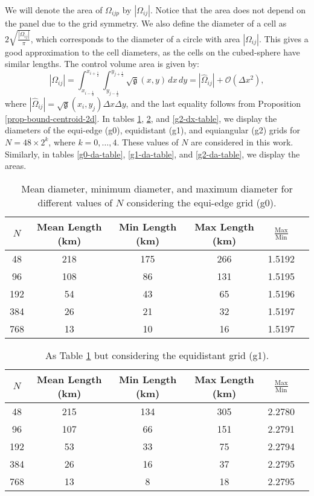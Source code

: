 We will denote the area of $\Omega_{ijp}$ by $|\Omega_{ij}|$.
Notice that the area does not depend on the panel due to the grid symmetry.
We also define the diameter of a cell as $2\sqrt{\frac{|\Omega_{ij}|}{\pi}}$, which corresponds to the diameter of a circle with area $|\Omega_{ij}|$.
This gives a good approximation to the cell diameters, as the cells on the cubed-sphere have similar lengths.
The control volume area is given by:
\begin{equation}
	\label{chp4-area}
	|\Omega_{ij}| = \int_{x_{i-\frac{1}{2}}}^{x_{i+\frac{1}{2}}} \int_{y_{j-\frac{1}{2}}}^{y_{j+\frac{1}{2}}}{\sqrt{\mathfrak{g}}(x,y)} \,dx \,dy = 
	|\hat{\Omega}_{ij}| + \mathcal{O}(\Delta x^2),
\end{equation}
where $|\hat{\Omega}_{ij}| = \sqrt{\mathfrak{g}}(x_i,y_j) \Delta x \Delta y$,
and the last equality follows from Proposition \ref{prop-bound-centroid-2d}.
In tables \ref{g0-dx-table}, \ref{g1-dx-table}, and \ref{g2-dx-table},
we display the diameters of the  equi-edge (g0), equidistant (g1), and equiangular (g2) grids for $N=48\times 2^k$, 
where $k = 0,\ldots, 4$. These values of $N$ are considered in this work.
Similarly, in tables \ref{g0-da-table}, \ref{g1-da-table}, and \ref{g2-da-table}, we display the areas.


\begin{table}[htbp]
    \centering
    \caption{Mean diameter, minimum diameter, and maximum diameter for different values of $N$ considering the equi-edge grid (g0).\label{g0-dx-table}}
    \begin{tabular}{cccccc}
        \toprule
        $N$ & Mean Length (km) & Min Length (km) & Max Length (km) & $\frac{\text{Max}}{\text{Min}}$ \\
        \midrule
        48 & 218 & 175 & 266 & 1.5192 \\
        96 & 108 & 86 & 131 & 1.5195 \\
        192 & 54 & 43 & 65 & 1.5196 \\
        384 & 26 & 21 & 32 & 1.5197 \\
        768 & 13 & 10 & 16 & 1.5197 \\
        \bottomrule
    \end{tabular}
\end{table}

\begin{table}[htbp]
    \centering
    \caption{As Table \ref{g0-dx-table} but considering the equidistant grid (g1). \label{g1-dx-table}}
    \begin{tabular}{cccccc}
        \toprule
        $N$ & Mean Length (km) & Min Length (km) & Max Length (km) & $\frac{\text{Max}}{\text{Min}}$ \\
        \midrule
        48 & 215 & 134 & 305 & 2.2780 \\
        96 & 107 & 66 & 151 & 2.2791 \\
        192 & 53 & 33 & 75 & 2.2794 \\
        384 & 26 & 16 & 37 & 2.2795 \\
        768 & 13 & 8 & 18 & 2.2795 \\
        \bottomrule
    \end{tabular}
\end{table}

